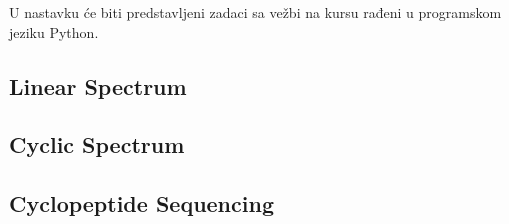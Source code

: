 U nastavku će biti predstavljeni zadaci sa vežbi na kursu rađeni u programskom jeziku Python.

\subsection{Linear Spectrum}



\subsection{Cyclic Spectrum}



\subsection{Cyclopeptide Sequencing}


